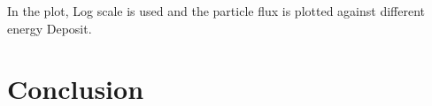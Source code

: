 \documentclass{article}
\begin{document}
\begin{multicols}{2}
In the plot, Log scale is used and the particle flux is plotted against different energy Deposit.



\section{Conclusion}















\end{multicols}


\end{document}
